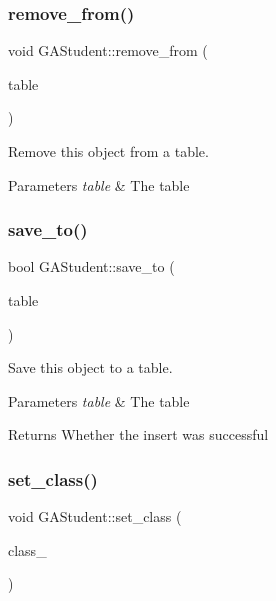 \subsubsection{\texorpdfstring{remove\+\_\+from()}{remove\_from()}}
{\footnotesize\ttfamily void G\+A\+Student\+::remove\+\_\+from (\begin{DoxyParamCaption}\item[{\hyperlink{class_database_table}{Database\+Table} $\ast$}]{table }\end{DoxyParamCaption})}



Remove this object from a table. 


\begin{DoxyParams}{Parameters}
{\em table} & The table \\
\hline
\end{DoxyParams}
\mbox{\label{class_g_a_student_a752f52729e51c7b3b31d86a3e812088b}} 
\subsubsection{\texorpdfstring{save\+\_\+to()}{save\_to()}}
{\footnotesize\ttfamily bool G\+A\+Student\+::save\+\_\+to (\begin{DoxyParamCaption}\item[{\hyperlink{class_database_table}{Database\+Table} $\ast$}]{table }\end{DoxyParamCaption})}



Save this object to a table. 


\begin{DoxyParams}{Parameters}
{\em table} & The table \\
\hline
\end{DoxyParams}
\begin{DoxyReturn}{Returns}
Whether the insert was successful 
\end{DoxyReturn}
\mbox{\label{class_g_a_student_a032086c71e6852d47c3204c10ac481e3}} 
\subsubsection{\texorpdfstring{set\+\_\+class()}{set\_class()}}
{\footnotesize\ttfamily void G\+A\+Student\+::set\+\_\+class (\begin{DoxyParamCaption}\item[{\hyperlink{class_g_a_class}{G\+A\+Class} $\ast$}]{class\+\_\+ }\end{DoxyParamCaption})}



